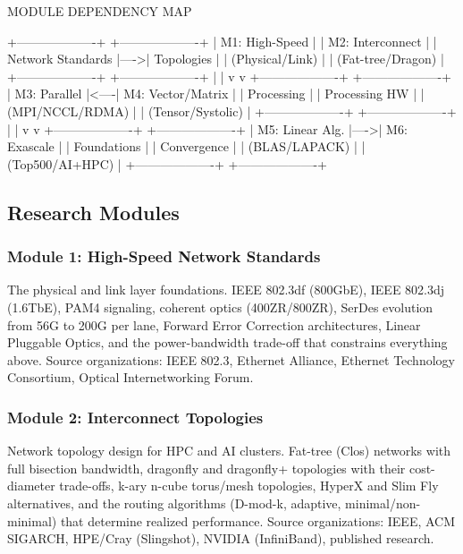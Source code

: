 \documentclass[11pt,letterpaper]{article}
\begin{document}
\begin{asciibox}
MODULE DEPENDENCY MAP

  +-------------------+     +-------------------+
  | M1: High-Speed    |     | M2: Interconnect  |
  | Network Standards |---->| Topologies        |
  | (Physical/Link)   |     | (Fat-tree/Dragon) |
  +-------------------+     +-------------------+
          |                         |
          v                         v
  +-------------------+     +-------------------+
  | M3: Parallel      |<----| M4: Vector/Matrix |
  | Processing        |     | Processing HW     |
  | (MPI/NCCL/RDMA)   |     | (Tensor/Systolic) |
  +-------------------+     +-------------------+
          |                         |
          v                         v
  +-------------------+     +-------------------+
  | M5: Linear Alg.   |---->| M6: Exascale      |
  | Foundations        |     | Convergence       |
  | (BLAS/LAPACK)      |     | (Top500/AI+HPC)   |
  +-------------------+     +-------------------+
\end{asciibox}

\subsection{Research Modules}

\subsubsection{Module 1: High-Speed Network Standards}
The physical and link layer foundations. IEEE 802.3df (800GbE), IEEE 802.3dj (1.6TbE), PAM4 signaling, coherent optics (400ZR/800ZR), SerDes evolution from 56G to 200G per lane, Forward Error Correction architectures, Linear Pluggable Optics, and the power-bandwidth trade-off that constrains everything above. Source organizations: IEEE 802.3, Ethernet Alliance, Ethernet Technology Consortium, Optical Internetworking Forum.

\subsubsection{Module 2: Interconnect Topologies}
Network topology design for HPC and AI clusters. Fat-tree (Clos) networks with full bisection bandwidth, dragonfly and dragonfly+ topologies with their cost-diameter trade-offs, k-ary n-cube torus/mesh topologies, HyperX and Slim Fly alternatives, and the routing algorithms (D-mod-k, adaptive, minimal/non-minimal) that determine realized performance. Source organizations: IEEE, ACM SIGARCH, HPE/Cray (Slingshot), NVIDIA (InfiniBand), published research.
\end{document}
